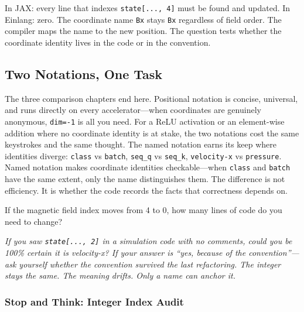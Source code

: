 \documentclass[11pt,titlepage]{article}
\begin{document}
In JAX: every line that indexes \texttt{state{[}...,\ 4{]}} must be
found and updated. In Einlang: zero. The coordinate name \texttt{Bx}
stays \texttt{Bx} regardless of field order. The compiler maps the name
to the new position. The question tests whether the coordinate identity
lives in the code or in the convention.

\vspace{2em}

\hypertarget{two-notations-one-task}{%
\subsection{Two Notations, One Task}\label{two-notations-one-task}}

The three comparison chapters end here. Positional notation is concise,
universal, and runs directly on every accelerator---when coordinates are
genuinely anonymous, \texttt{dim=-1} is all you need. For a ReLU
activation or an element-wise addition where no coordinate identity is
at stake, the two notations cost the same keystrokes and the same
thought. The named notation earns its keep where identities diverge:
\texttt{class} vs \texttt{batch}, \texttt{seq\_q} vs \texttt{seq\_k},
\texttt{velocity-x} vs \texttt{pressure}. Named notation makes
coordinate identities checkable---when \texttt{class} and \texttt{batch}
have the same extent, only the name distinguishes them. The difference
is not efficiency. It is whether the code records the facts that
correctness depends on.

If the magnetic field index moves from 4 to 0, how many lines of code do
you need to change?

\vspace{2em}

\emph{If you saw \texttt{state{[}...,\ 2{]}} in a simulation code with
no comments, could you be 100\% certain it is velocity-x? If your answer
is ``yes, because of the convention''---ask yourself whether the
convention survived the last refactoring. The integer stays the same.
The meaning drifts. Only a name can anchor it.}

\vspace{2em}

\hypertarget{stop-and-think-integer-index-audit}{%
\subsubsection{Stop and Think: Integer Index
Audit}\label{stop-and-think-integer-index-audit}}
\end{document}
